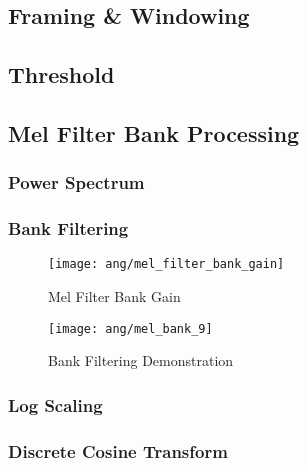\subsection{Framing \& Windowing}


\subsection{Threshold}


\subsection{Mel Filter Bank Processing}

\subsubsection{Power Spectrum}


\subsubsection{Bank Filtering}

\begin{figure}[H]
\centering
\texttt{[image: ang/mel\_filter\_bank\_gain]}
\caption{Mel Filter Bank Gain}
\end{figure}

\begin{figure}[H]
\centering
\texttt{[image: ang/mel\_bank\_9]}
\caption{Bank Filtering Demonstration}
\end{figure}


\subsubsection{Log Scaling}


\subsubsection{Discrete Cosine Transform}

